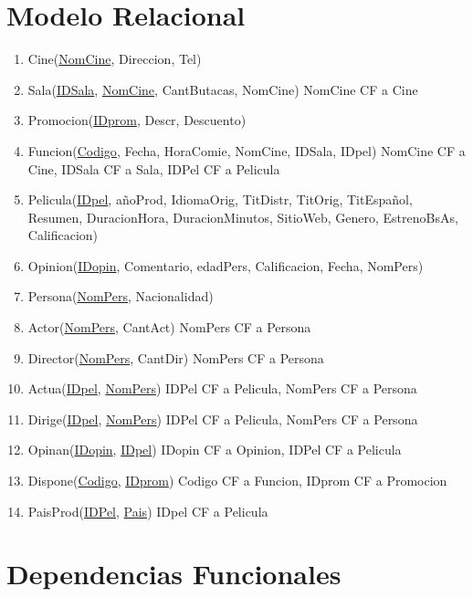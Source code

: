 \documentclass{article}
\begin{document}
\section*{Modelo Relacional}
  \begin{enumerate}
    \item Cine(\underline{NomCine}, Direccion, Tel)
    \item Sala(\underline{IDSala}, \underline{NomCine}, CantButacas, NomCine) \newline
      NomCine CF a Cine
    \item Promocion(\underline{IDprom}, Descr, Descuento)
    \item Funcion(\underline{Codigo}, Fecha, HoraComie, NomCine, IDSala, IDpel) \newline
      NomCine CF a Cine, IDSala CF a Sala, IDPel CF a Pelicula
    \item Pelicula(\underline{IDpel}, añoProd, IdiomaOrig, TitDistr, TitOrig, TitEspañol, Resumen, DuracionHora, DuracionMinutos, SitioWeb, Genero, EstrenoBsAs, Calificacion)
    \item Opinion(\underline{IDopin}, Comentario, edadPers, Calificacion, Fecha, NomPers)
    \item Persona(\underline{NomPers}, Nacionalidad)
    \item Actor(\underline{NomPers}, CantAct) NomPers CF a Persona
    \item Director(\underline{NomPers}, CantDir) NomPers CF a Persona
    \item Actua(\underline{IDpel}, \underline{NomPers}) \newline
      IDPel CF a Pelicula, NomPers CF a Persona
    \item Dirige(\underline{IDpel}, \underline{NomPers}) \newline
      IDPel CF a Pelicula, NomPers CF a Persona
    \item Opinan(\underline{IDopin}, \underline{IDpel}) \newline
      IDopin CF a Opinion, IDPel CF a Pelicula
    \item Dispone(\underline{Codigo}, \underline{IDprom}) \newline
      Codigo CF a Funcion, IDprom CF a Promocion
    \item PaisProd(\underline{IDPel}, \underline{Pais}) \newline
      IDpel CF a Pelicula
  \end{enumerate}

\section*{Dependencias Funcionales}
\end{document}
